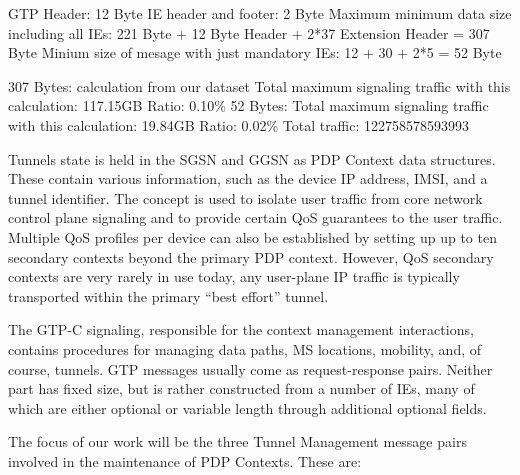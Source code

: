 GTP Header: 12 Byte
IE header and footer: 2 Byte
Maximum minimum data size including all \glspl{IE}: 221 Byte + 12 Byte Header + 2*37 Extension Header = 307 Byte
Minium size of mesage with just mandatory \glspl{IE}: 12 + 30 + 2*5 = 52 Byte

307 Bytes:
calculation from our dataset
Total maximum signaling traffic with this calculation: 117.15GB
Ratio: 0.10\%
52 Bytes:
Total maximum signaling traffic with this calculation: 19.84GB
Ratio: 0.02\%
Total traffic: 122758578593993

Tunnels state is held in the \gls{SGSN} and \gls{GGSN} as \gls{PDP} Context data structures. These contain various information, such as the device IP address, \gls{IMSI}, and a tunnel identifier. The concept is used to isolate user traffic from core network control plane signaling and to provide certain \gls{QoS} guarantees to the user traffic. Multiple \gls{QoS} profiles per device can also be established by setting up up to ten secondary contexts beyond the primary PDP context. However, \gls{QoS} secondary contexts are very rarely in use today, any user-plane IP traffic is typically transported within the primary ``best effort'' tunnel.

The GTP-C signaling, responsible for the context management interactions, contains procedures for managing data paths, \gls{MS} locations, mobility, and, of course, tunnels. \gls{GTP} messages usually come as request-response pairs. Neither part has fixed size, but is rather constructed from a number of \glspl{IE}, many of which are either optional or variable length through additional optional fields.

The focus of our work will be the three Tunnel Management message pairs involved in the maintenance of PDP Contexts. These are:

